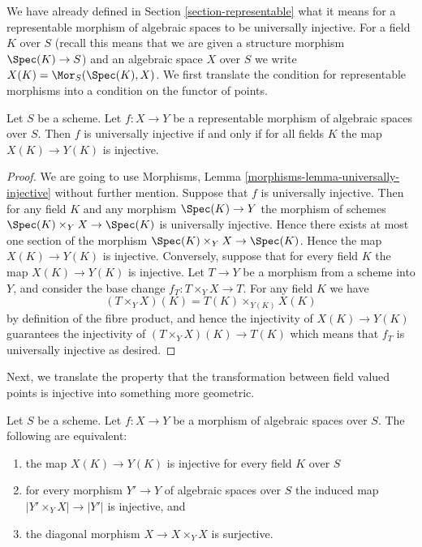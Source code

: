 \noindent
We have already defined in Section \ref{section-representable}
what it means for a representable morphism of algebraic spaces
to be universally injective. For a field $K$ over $S$ (recall this means that
we are given a structure morphism $\Spec(K) \to S$) and an
algebraic space $X$ over $S$ we write
$X(K) = \Mor_S(\Spec(K), X)$. We first translate the
condition for representable morphisms into a condition on the functor
of points.

\begin{lemma}
\label{lemma-universally-injective-representable}
Let $S$ be a scheme. Let $f : X \to Y$ be a representable
morphism of algebraic spaces over $S$. Then
$f$ is universally injective if and only if for all fields $K$ the
map $X(K) \to Y(K)$ is injective.
\end{lemma}

\begin{proof}
We are going to use
Morphisms, Lemma \ref{morphisms-lemma-universally-injective}
without further mention.
Suppose that $f$ is universally injective. Then for any field $K$ and any
morphism $\Spec(K) \to Y$ the morphism of schemes
$\Spec(K) \times_Y X \to \Spec(K)$ is universally injective.
Hence there exists at most one section of the morphism
$\Spec(K) \times_Y X \to \Spec(K)$. Hence the map
$X(K) \to Y(K)$ is injective. Conversely, suppose that for every field $K$
the map $X(K) \to Y(K)$ is injective. Let $T \to Y$ be a morphism from a
scheme into $Y$, and consider the base change $f_T : T \times_Y X \to T$.
For any field $K$ we have
$$
(T \times_Y X)(K) = T(K) \times_{Y(K)} X(K)
$$
by definition of the fibre product, and hence the injectivity of
$X(K) \to Y(K)$ guarantees the injectivity of
$(T \times_Y X)(K) \to T(K)$ which means that $f_T$ is universally injective
as desired.
\end{proof}

\noindent
Next, we translate the property that the transformation between field valued
points is injective into something more geometric.

\begin{lemma}
\label{lemma-universally-injective}
Let $S$ be a scheme.
Let $f : X \to Y$ be a morphism of algebraic spaces over $S$.
The following are equivalent:
\begin{enumerate}
\item the map $X(K) \to Y(K)$ is injective for every field $K$ over $S$
\item for every morphism $Y' \to Y$ of algebraic spaces over $S$
the induced map $|Y' \times_Y X| \to |Y'|$ is injective, and
\item the diagonal morphism $X \to X \times_Y X$ is surjective.
\end{enumerate}
\end{lemma}

